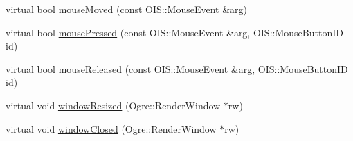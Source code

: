 \begin{DoxyCompactItemize}
\item 
virtual bool \mbox{\hyperlink{class_base_application_a126e59cb246b061e51eb6ce06a2ee8f4}{mouse\+Moved}} (const O\+I\+S\+::\+Mouse\+Event \&arg)
\item 
virtual bool \mbox{\hyperlink{class_base_application_a9255dfc1eabefd11c474ec45a6622504}{mouse\+Pressed}} (const O\+I\+S\+::\+Mouse\+Event \&arg, O\+I\+S\+::\+Mouse\+Button\+ID id)
\item 
virtual bool \mbox{\hyperlink{class_base_application_aa102c5859c14c0690c749994a446b53d}{mouse\+Released}} (const O\+I\+S\+::\+Mouse\+Event \&arg, O\+I\+S\+::\+Mouse\+Button\+ID id)
\item 
virtual void \mbox{\hyperlink{class_base_application_afacf8a797588592ef0abbad593f10cfa}{window\+Resized}} (Ogre\+::\+Render\+Window $\ast$rw)
\item 
virtual void \mbox{\hyperlink{class_base_application_ae0e37ac54a31ff6e51d58c7654ad1b90}{window\+Closed}} (Ogre\+::\+Render\+Window $\ast$rw)
\end{DoxyCompactItemize}
